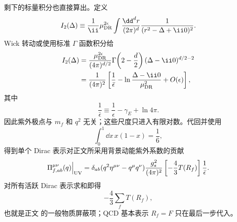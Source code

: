 \begin{derivation}[夸克圈对规范耦合的修正]
剩下的标量积分也直接算出。定义
\begin{equation*}
 I_2(\Delta)
 \equiv\frac1{\ii}\mu_{\rm DR}^{2\epsilon}
 \int\frac{\dd^d r}{(2\pi)^d}
 \frac1{(r^2-\Delta+\ii0)^2}.
\end{equation*}
Wick 转动或使用标准 $\Gamma$ 函数积分给
\begin{align*}
 I_2(\Delta)
 &=\frac{\mu_{\rm DR}^{2\epsilon}}
 {(4\pi)^{d/2}}
 \Gamma\!\left(2-\frac d2\right)
 (\Delta-\ii0)^{d/2-2}\\
 &=\frac1{(4\pi)^2}
 \left[
 \frac1{\bar\epsilon}
 -\ln\frac{\Delta-\ii0}{\mu_{\rm DR}^2}
 +O(\epsilon)
 \right],
\end{align*}
其中
\begin{equation*}
 \frac1{\bar\epsilon}
 \equiv\frac1\epsilon-\gamma_E+\ln4\pi.
\end{equation*}
因此紫外极点与 $m_f$ 和 $q^2$ 无关；这些尺度只进入有限对数。代回并使用
\begin{equation*}
 \int_0^1\dd x\,x(1-x)=\frac16,
\end{equation*}
得到单个 Dirac 表示对正文所采用背景动能紫外系数的贡献
\begin{equation*}
 \Pi_{f,ab}^{\mu\nu}(q)\Big|_{\rm UV}
 =\delta_{ab}(q^2\eta^{\mu\nu}-q^\mu q^\nu)
 \frac{g_s^2}{(4\pi)^2}
 \left[-\frac43T(R_f)\right]
 \frac1{\bar\epsilon}.
\end{equation*}
对所有活跃 Dirac 表示求和即得
\begin{equation*}
 -\frac43\sum_fT(R_f),
\end{equation*}
也就是正文 的一般物质屏蔽项；QCD 基本表示 $R_f=F$ 只在最后一步代入。
\end{derivation}

